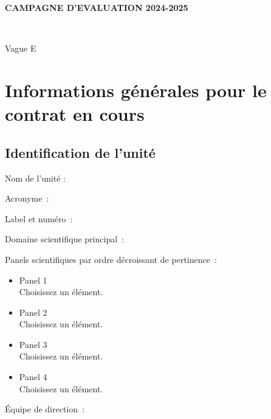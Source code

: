 \documentclass[]{article}
\begin{document}
\begin{titlepage}
\begin{tcolorbox}[standard jigsaw, opacityback=0, opacityframe=0,boxsep=.7cm,left skip=4cm, right skip=-4cm, before skip=5cm]
{\color{hcerespurple}\Large\makeatletter\@title\makeatother}


\vskip 2cm
{\raggedright\color{hceresred}\bf\large CAMPAGNE D'EVALUATION 2024-2025
}\\
{\raggedright\color{hceresred}\large Vague E
}
\par\vskip 2cm
{\raggedright\color{hcerespurple}\large\makeatletter\@date\makeatother}

\par
\end{tcolorbox}
\end{titlepage}



\section{Informations générales pour le contrat en cours}

\subsection{Identification de l'unité}

Nom de l'unité :

Acronyme~:

Label et numéro~:

Domaine scientifique principal~:

Panels scientifiques par ordre décroissant de pertinence~:

\begin{itemize}
\tightlist
\item
  Panel 1\\
  Choisissez un élément.
\item
  Panel 2\\
  Choisissez un élément.
\item
  Panel 3\\
  Choisissez un élément.
\item
  Panel 4\\
  Choisissez un élément.
\end{itemize}

Équipe de direction~:
\end{document}
